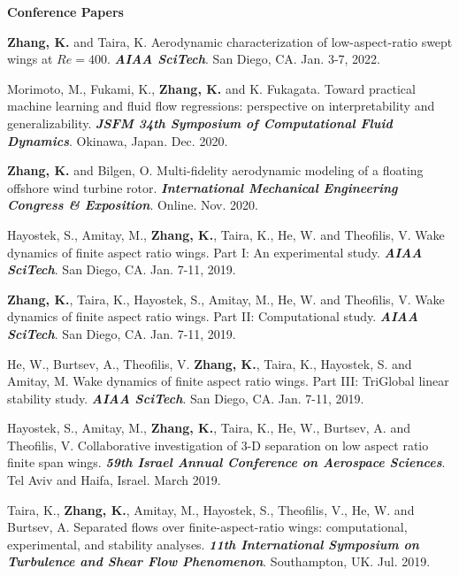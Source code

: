 \documentclass[10pt]{article}
\begin{document}
\vspace{+0.1in}
{\bf \color{Blue}Conference Papers}

{\small
\begin{etaremune}

\item \textbf{Zhang, K.} and Taira, K. Aerodynamic characterization of low-aspect-ratio swept wings at $Re=400$. \textit{\textbf{AIAA SciTech}}. San Diego, CA. Jan. 3-7, 2022.

\item Morimoto, M., Fukami, K., \textbf{Zhang, K.} and K. Fukagata. Toward practical machine learning and fluid flow regressions: perspective on interpretability and generalizability. \textit{\textbf{JSFM 34th Symposium of Computational Fluid Dynamics}}. Okinawa, Japan. Dec. 2020.

\item \textbf{Zhang, K.} and Bilgen, O. Multi-fidelity aerodynamic modeling of a floating offshore wind turbine rotor. \textit{\textbf{International Mechanical Engineering Congress \& Exposition}}. Online. Nov. 2020.

\item Hayostek, S., Amitay, M., \textbf{Zhang, K.}, Taira, K., He, W. and Theofilis, V. Wake dynamics of finite aspect ratio wings. Part I: An experimental study. \textit{\textbf{AIAA SciTech}}. San Diego, CA. Jan. 7-11, 2019.

\item \textbf{Zhang, K.}, Taira, K., Hayostek, S., Amitay, M., He, W. and Theofilis, V. Wake dynamics of finite aspect ratio wings. Part II: Computational study. \textit{\textbf{AIAA SciTech}}. San Diego, CA. Jan. 7-11, 2019.

\item He, W., Burtsev, A., Theofilis, V. \textbf{Zhang, K.}, Taira, K., Hayostek, S. and Amitay, M. Wake dynamics of finite aspect ratio wings. Part III: TriGlobal linear stability study.
 \textit{\textbf{AIAA SciTech}}. San Diego, CA. Jan. 7-11, 2019.

\item Hayostek, S., Amitay, M., \textbf{Zhang, K.}, Taira, K., He, W., Burtsev, A. and Theofilis, V. Collaborative investigation of 3-D separation on low aspect ratio finite span wings.
 \textit{\textbf{59th Israel Annual Conference on Aerospace Sciences}}. Tel Aviv and Haifa, Israel. March 2019.

\item Taira, K., \textbf{Zhang, K.}, Amitay, M., Hayostek, S., Theofilis, V., He, W. and Burtsev, A. Separated flows over finite-aspect-ratio wings: computational, experimental, and stability analyses. \textit{\textbf{11th International Symposium on Turbulence and Shear Flow Phenomenon}}. Southampton, UK. Jul. 2019.


\end{etaremune}}
\end{document}
